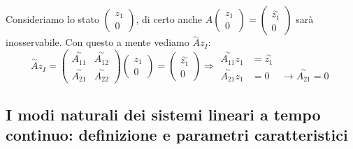 \documentclass{article}
\begin{document}
Consideriamo lo stato $\begin{pmatrix}z_1\\0\end{pmatrix}$,
di certo anche $A\begin{pmatrix}z_1\\0\end{pmatrix}=\begin{pmatrix}\overset{\sim }{z_1}\\0\end{pmatrix}$
sarà inosservabile.
Con questo a mente vediamo $\overset{\sim}{A}z_I$:
\[
    \overset{\sim}{A}z_I=\begin{pmatrix}\overset{\sim }{A_{11}}&\overset{\sim }{A_{12}}\\
        \overset{\sim }{A_{21}}&\overset{\sim }{A_{22}}\end{pmatrix}\begin{pmatrix}z_1\\0\end{pmatrix}=
    \begin{pmatrix}\overset{\sim }{z_1}\\0\end{pmatrix} \Longrightarrow
    \begin{array}{rcl}
    \overset{\sim }{A_{11}}z_{1} &= \overset{\sim }{z_1}&\\
    \overset{\sim }{A_{21}}z_{1} &= 0 &\to  \overset{\sim }{A_{21}}=0
    \end{array}
\]






\subsection{I modi naturali dei sistemi lineari a tempo continuo: definizione e parametri caratteristici}
\end{document}
